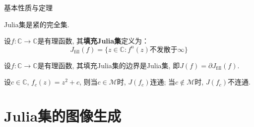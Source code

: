 \documentclass[9pt]{beamer}
\begin{document}
\begin{frame}{基本性质与定理}
    \begin{theorem}
        \small Julia集是紧的完全集. \cite{2014Fractals}
    \end{theorem}

    \begin{definition}
        \small 设$f:\mathbb{C}\to\mathbb{C}$是有理函数, 其\textbf{填充Julia集}定义为：
        \begin{equation*}
            J_{\text{fill}}(f)=\{z\in\mathbb{C}:f^n(z)\text{不发散于}\infty\}
        \end{equation*}
    \end{definition}
    
    \begin{theorem}
        \small 设$f:\mathbb{C}\to\mathbb{C}$是有理函数, 其填充Julia集的边界是Julia集, 即$J(f)=\partial J_{\text{fill}}(f)$. \cite{尹永成2002The}
    \end{theorem}

    \begin{theorem}
        \small 设$c\in\mathbb{C}$, $f_c(z)=z^2+c$, 则当$c\in\mathcal{M}$时, $J(f_c)$连通; 当$c\notin\mathcal{M}$时, $J(f_c)$不连通. \cite{2019ComplexAnalysis}
    \end{theorem}
\end{frame}


\section{Julia集的图像生成}
\end{document}
